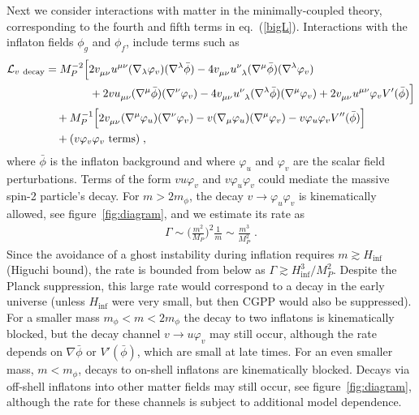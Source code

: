 \documentclass[11pt,a4paper]{article}
\newcommand{\ba}[1]{\begin{align} #1 \end{align}}
\newcommand{\bes}[1]{\begin{equation}\begin{split} #1 \end{split}\end{equation}}
\newcommand{\Lcal}{\mathcal{L}}
\newcommand{\Mpl}{M_P}
\newcommand{\MP}{M_P}
\newcommand{\fref}[1]{figure~\ref{#1}}
\newcommand{\eref}[1]{eq.~(\ref{#1})}
\begin{document}
\begin{appendix}
Next we consider interactions with matter in the minimally-coupled theory, corresponding to the fourth and fifth terms in \eref{bigL}.
Interactions with the inflaton fields $\phi_g$ and $\phi_f$, include terms such as
\bes{
    \Lcal_{v~\mathrm{decay}} 
    & =\Mpl^{-2}\Big[
    2 v\indices{_\mu_\nu} u\indices{^\mu^\nu} (\nabla_\lambda \varphi_v) (\nabla^\lambda \bar{\phi}) 
    - 4 v\indices{_\mu_\nu} u\indices{^\nu_\lambda} (\nabla^\mu \bar{\phi}) (\nabla^\lambda \varphi_v) 
    \\ & \qquad \qquad  
    + 2 v u\indices{_\mu_\nu} (\nabla^\mu \bar{\phi}) (\nabla^\nu \varphi_v) 
    - 4 v\indices{_\mu_\nu} u\indices{^\nu_\lambda} (\nabla^\lambda \bar{\phi}) (\nabla^\mu \varphi_v) + 2 v\indices{_\mu_\nu} u\indices{^\mu^\nu} \varphi_v V'(\bar{\phi})\Big] 
    \\ & \quad 
    +\Mpl^{-1}\Big[ 2 v\indices{_\mu_\nu} (\nabla^\mu \varphi_u) (\nabla^\nu \varphi_v) 
    - v (\nabla_\mu \varphi_u) (\nabla^\mu \varphi_v) 
    - v \varphi_u \varphi_v V''(\bar{\phi}) \Big] 
    \\ & \quad 
    + ( v \varphi_v \varphi_v \text{ terms} )
  \;,
}
where $\bar{\phi}$ is the inflaton background and where $\varphi_u$ and $\varphi_v$ are the scalar field perturbations. Terms of the form $v u \varphi_v$ and $v \varphi_u \varphi_v$ could mediate the massive spin-2 particle's decay.  For $m > 2 m_\phi$, the decay $v \to \varphi_u \varphi_v$ is kinematically allowed, see \fref{fig:diagram}, and we estimate its rate as 
\ba{\label{eq:Gamma_decay}
    \Gamma 
    \sim \biggl( \frac{m^2}{\Mpl} \biggr)^2 \frac{1}{m}
    \sim \frac{m^3}{\Mpl^2}
    \;.
}
Since the avoidance of a ghost instability during inflation requires $m \gtrsim H_\mathrm{inf}$ (Higuchi bound), the rate is bounded from below as $\Gamma \gtrsim H_\mathrm{inf}^3 / \MP^2$.  Despite the Planck suppression, this large rate would correspond to a decay in the early universe (unless $H_\mathrm{inf}$ were very small, but then CGPP would also be suppressed).  For a smaller mass $m_\phi < m < 2 m_\phi$ the decay to two inflatons is kinematically blocked, but the decay channel $v \to u \varphi_v$ may still occur, although the rate depends on $\nabla\bar{\phi}$ or $V'(\bar{\phi})$, which are small at late times. For an even smaller mass, $m < m_\phi$, decays to on-shell inflatons are kinematically blocked.  Decays via off-shell inflatons into other matter fields may still occur, see \fref{fig:diagram}, although the rate for these channels is subject to additional model dependence.  


\end{appendix}
\end{document}
